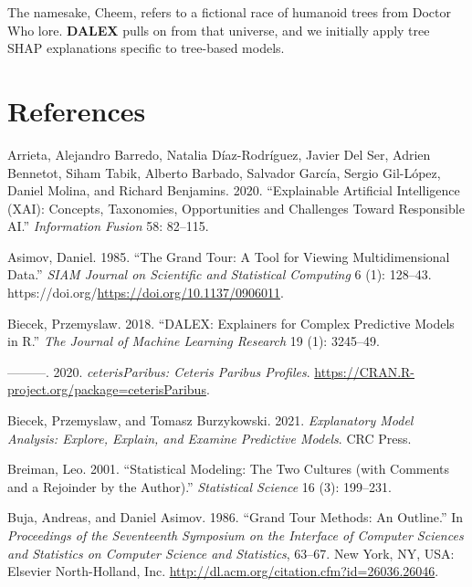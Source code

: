 \documentclass[
]{article}
\newlength{\cslhangindent}
\newlength{\cslentryspacingunit} %
\newenvironment{CSLReferences}[2] %
 {%
  \setlength{\parindent}{0pt}
  \ifodd #1
  \let\oldpar\par
  \def\par{\hangindent=\cslhangindent\oldpar}
  \fi
  \setlength{\parskip}{#2\cslentryspacingunit}
 }%
 {}
\begin{document}
The namesake, Cheem, refers to a fictional race of humanoid trees from Doctor Who lore. \textbf{DALEX} pulls on from that universe, and we initially apply tree SHAP explanations specific to tree-based models.

\hypertarget{references}{%
\section*{References}\label{references}}

\hypertarget{refs}{}
\begin{CSLReferences}{1}{0}
\leavevmode{}%
Arrieta, Alejandro Barredo, Natalia Díaz-Rodríguez, Javier Del Ser, Adrien Bennetot, Siham Tabik, Alberto Barbado, Salvador García, Sergio Gil-López, Daniel Molina, and Richard Benjamins. 2020. {``Explainable {Artificial} {Intelligence} ({XAI}): {Concepts}, Taxonomies, Opportunities and Challenges Toward Responsible {AI}.''} \emph{Information Fusion} 58: 82--115.

\leavevmode{}%
Asimov, Daniel. 1985. {``The {Grand} {Tour}: A {Tool} for {Viewing} {Multidimensional} {Data}.''} \emph{SIAM Journal on Scientific and Statistical Computing} 6 (1): 128--43. https://doi.org/\url{https://doi.org/10.1137/0906011}.

\leavevmode{}%
Biecek, Przemyslaw. 2018. {``{DALEX}: Explainers for Complex Predictive Models in {R}.''} \emph{The Journal of Machine Learning Research} 19 (1): 3245--49.

\leavevmode{}%
---------. 2020. \emph{{ceterisParibus}: {Ceteris} {Paribus} {Profiles}}. \url{https://CRAN.R-project.org/package=ceterisParibus}.

\leavevmode{}%
Biecek, Przemyslaw, and Tomasz Burzykowski. 2021. \emph{Explanatory {Model} {Analysis}: {Explore}, {Explain}, and {Examine} {Predictive} {Models}}. CRC Press.

\leavevmode{}%
Breiman, Leo. 2001. {``Statistical Modeling: {The} Two Cultures (with Comments and a Rejoinder by the Author).''} \emph{Statistical Science} 16 (3): 199--231.

\leavevmode{}%
Buja, Andreas, and Daniel Asimov. 1986. {``Grand {Tour} {Methods}: {An} {Outline}.''} In \emph{Proceedings of the {Seventeenth} {Symposium} on the {Interface} of {Computer} {Sciences} and {Statistics} on {Computer} {Science} and {Statistics}}, 63--67. New York, NY, USA: Elsevier North-Holland, Inc. \url{http://dl.acm.org/citation.cfm?id=26036.26046}.


\end{CSLReferences}
\end{document}
